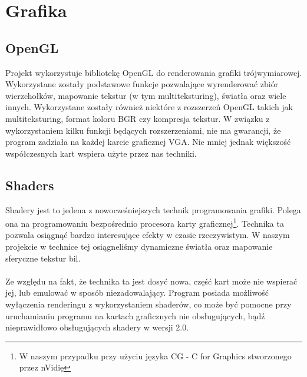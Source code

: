 \section{Grafika}
\subsection{OpenGL}

Projekt wykorzystuje bibliotekę OpenGL do renderowania grafiki trójwymiarowej. Wykorzystane zostały podstawowe funkcje
pozwalające wyrenderować zbiór wierzchołków, mapowanie tekstur (w tym multiteksturing), światła oraz wiele innych. 
Wykorzystane zostały również niektóre z rozszerzeń OpenGL takich jak multiteksturing, format koloru BGR czy kompresja tekstur. W związku z wykorzystaniem kilku funkcji będących rozszerzeniami, nie ma gwarancji, że program zadziała na każdej karcie graficznej VGA. Nie mniej jednak większość współczesnych kart wspiera użyte przez nas techniki.

\subsection{Shaders}

Shadery jest to jedena z nowocześniejszych technik programowania grafiki. Polega ona na programowaniu bezpośrednio procesora karty graficznej\footnote{W naszym przypadku przy użyciu języka CG - C for Graphics stworzonego przez nVidię}. Technika ta pozwala osiągnąć bardzo interesujące efekty w czasie rzeczywistym. W naszym projekcie w technice tej osiągneliśmy dynamiczne światła oraz mapowanie sferyczne tekstur bil.\\ \\
Ze względu na fakt, że technika ta jest dosyć nowa, część kart może nie wspierać jej, lub emulować w sposób niezadowalający. Program posiada możliwość wyłączenia renderingu z wykorzystaniem shaderów, co może być pomocne przy uruchamianiu programu na kartach graficznych nie obsługujących, bądź nieprawidłowo obsługujących shadery w wersji 2.0.